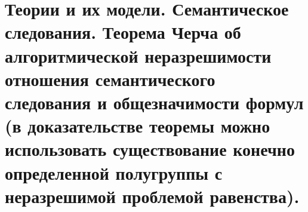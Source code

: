\section{Теории и их модели. Семантическое следования. Теорема Черча об алгоритмической неразрешимости отношения семантического следования и общезначимости формул (в доказательстве теоремы можно использовать существование конечно определенной полугруппы с неразрешимой проблемой равенства).}